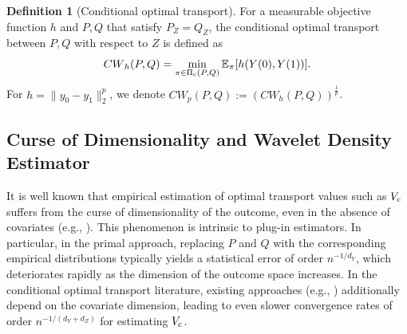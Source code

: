 \documentclass{article}
\theoremstyle{plain}
\theoremstyle{definition}
\newtheorem{definition}{Definition}[section]
\def\EE{\mathbb{E}}
\def\PP{P}
\def\QQ{Q}
\def\calX{\mathcal{X}}
\newcommand{\cc}{\textup{c}}
\newcommand{\Let}{\triangleq}
\theoremstyle{plain}
\def\EE{\mathbb{E}}
\def\calX{\mathcal{X}}
\newcommand{\Cwass}{{CW}}
\renewcommand{\Let}{\triangleq}
\begin{document}

\begin{definition}[Conditional optimal transport]
    For a measurable objective function $h$ and $\PP, \QQ$ that satisfy $\PP_Z = \QQ_Z$, the conditional optimal transport between $\PP, \QQ$ with respect to $Z$ is defined as
    \[
        \Cwass_h(\PP, \QQ) = \min_{\pi \in \Pi_{\cc}(\PP, \QQ) } \mathbb{E}_\pi[h(Y(0), Y(1))].
    \]
    For $h = \|y_0 - y_1\|_2^p$, we denote $\Cwass_p(\PP, \QQ) := (\Cwass_h(\PP, \QQ))^{\frac{1}{p}}$.
\end{definition}


\subsection{Curse of Dimensionality and Wavelet Density Estimator}\label{sec:wavelet.density.estimator}
It is well known that empirical estimation of optimal transport values such as $V_{\cc}$ suffers from the curse of dimensionality of the outcome, even in the absence of covariates (e.g., \cite{fournier2015rate}). This phenomenon is intrinsic to plug-in estimators. In particular, in the primal approach, replacing $\PP$ and $\QQ$ with the corresponding empirical distributions typically yields a statistical error of order $n^{-1/d_Y}$, which deteriorates rapidly as the dimension of the outcome space increases. In the conditional optimal transport literature, existing approaches (e.g., \cite{lin2025tightening, lin2025estimation}) additionally depend on the covariate dimension, leading to even slower convergence rates of order $n^{-1/(d_Y + d_Z)}$ for estimating $V_{\cc}$. 
\end{document}
